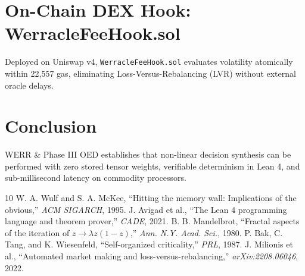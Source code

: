 \documentclass[journal,onecolumn]{IEEEtran}
\begin{document}
\section{On-Chain DEX Hook: WerracleFeeHook.sol}
Deployed on Uniswap v4, \texttt{WerracleFeeHook.sol} evaluates volatility atomically within 22,557 gas, eliminating Loss-Versus-Rebalancing (LVR) without external oracle delays.

\section{Conclusion}
WERR \& Phase III OED establishes that non-linear decision synthesis can be performed with zero stored tensor weights, verifiable determinism in Lean 4, and sub-millisecond latency on commodity processors.

\begin{thebibliography}{10}
 W. A. Wulf and S. A. McKee, ``Hitting the memory wall: Implications of the obvious,'' \emph{ACM SIGARCH}, 1995.
 J. Avigad et al., ``The Lean 4 programming language and theorem prover,'' \emph{CADE}, 2021.
 B. B. Mandelbrot, ``Fractal aspects of the iteration of $z \to \lambda z (1-z)$,'' \emph{Ann. N.Y. Acad. Sci.}, 1980.
 P. Bak, C. Tang, and K. Wiesenfeld, ``Self-organized criticality,'' \emph{PRL}, 1987.
 J. Milionis et al., ``Automated market making and loss-versus-rebalancing,'' \emph{arXiv:2208.06046}, 2022.
\end{thebibliography}
\end{document}
